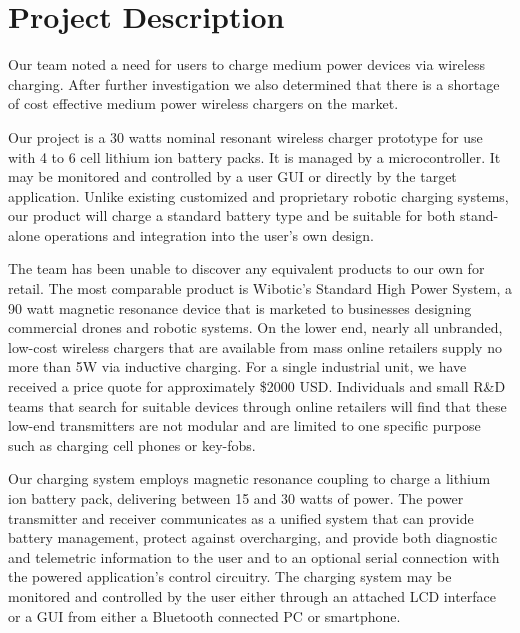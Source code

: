 \documentclass[12pt]{article}
\begin{document}

%
%
%
%
%	
%

\section{Project Description}
\indent \indent
Our team noted a need for users to charge medium power devices via wireless charging.  After further investigation we also determined that there is a shortage of cost effective medium power wireless chargers on the market.\\ \indent

Our project is a 30 watts nominal resonant wireless charger prototype for use with 4 to 6 cell lithium ion battery packs. It is managed by a microcontroller. It may be monitored and controlled by a user GUI or directly by the target application. Unlike existing customized and proprietary robotic charging systems, our product will charge a standard battery type and be suitable for both stand-alone operations and integration into the user's own design.\\ \indent

The team has been unable to discover any equivalent products to our own for retail. The most comparable product is Wibotic's Standard High Power System\cite{WiboSHPS}, a 90 watt magnetic resonance device that is marketed to businesses designing commercial drones and robotic systems. On the lower end, nearly all unbranded, low-cost wireless chargers that are available from mass online retailers supply no more than 5W via inductive charging. For a single industrial unit, we have received a price quote for approximately \$2000 USD. Individuals and small R\&D teams that search for suitable devices through online retailers will find that these low-end transmitters are not modular and are limited to one specific purpose such as charging cell phones or key-fobs.\\ \indent

Our charging system employs magnetic resonance coupling to charge a lithium ion battery pack, delivering between 15 and 30 watts of power. The power transmitter and receiver communicates as a unified system that can provide battery management, protect against overcharging, and provide both diagnostic and telemetric information to the user and to an optional serial connection with the powered application’s control circuitry. The charging system may be monitored and controlled by the user either through an attached LCD interface or a GUI from either a Bluetooth connected PC or smartphone.\\ \indent
\end{document}
